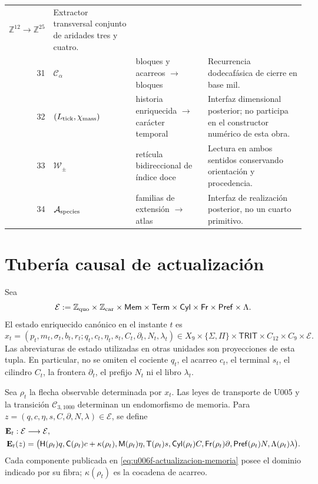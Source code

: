 \begin{longtable}{@{}r p{}p{}p{}@{}}
\(\mathbb Z^{12}\to\mathbb Z^{25}\)&
Extractor transversal conjunto de aridades tres y cuatro.\\
31&\(\mathcal C_\alpha\)&bloques y acarreos \(\to\) bloques&
Recurrencia dodecafásica de cierre en base mil.\\
32&\((L_{\rm tick},\chi_{\rm mass})\)&historia enriquecida \(\to\)
carácter temporal&
Interfaz dimensional posterior; no participa en el constructor numérico de
esta obra.\\
33&\(\mathcal W_\pm\)&retícula bidireccional de índice doce&
Lectura en ambos sentidos conservando orientación y procedencia.\\
34&\(\mathcal A_{\rm species}\)&familias de extensión \(\to\) atlas&
Interfaz de realización posterior, no un cuarto primitivo.\\
\bottomrule
\end{longtable}
\endgroup

\section{Tubería causal de actualización}

\begin{definition}
\label{def:u006f-esquema-estado}
Sea
\[
 \mathcal E:=
 \mathbb Z_{\rm quo}\times\mathbb Z_{\rm car}\times
 \mathsf{Mem}\times\mathsf{Term}\times\mathsf{Cyl}\times
 \mathsf{Fr}\times\mathsf{Pref}\times\Lambda .
\]
El estado enriquecido canónico en el instante \(t\) es
\begin{equation}
 x_t=(p_t,m_t,\sigma_t,b_t,r_t;
 q_t,c_t,\eta_t,s_t,C_t,\partial_t,N_t,\lambda_t)
 \in
 X_9\times\{\Sigma,\Pi\}\times\mathsf{TRIT}\times
 C_{12}\times C_9\times\mathcal E.
 \label{eq:u006f-esquema-estado}
\end{equation}
Las abreviaturas de estado utilizadas en otras unidades son proyecciones de
esta tupla. En particular, no se omiten el cociente \(q_t\), el acarreo
\(c_t\), el terminal \(s_t\), el cilindro \(C_t\), la frontera
\(\partial_t\), el prefijo \(N_t\) ni el libro \(\lambda_t\).
\end{definition}

Sea \(\rho_t\) la flecha observable determinada por \(x_t\). Las leyes de
transporte de U005 y la transición \(\mathcal C_{3,1000}\) determinan un
endomorfismo de memoria. Para
\(z=(q,c,\eta,s,C,\partial,N,\lambda)\in\mathcal E\), se define
\begin{align}
 \mathbf E_t:\mathcal E&\longrightarrow\mathcal E,\notag\\
 \mathbf E_t(z)&=\bigl(
 \mathsf H(\rho_t)q,
 \mathsf C(\rho_t)c+\kappa(\rho_t),
 \mathsf M(\rho_t)\eta,
 \mathsf T(\rho_t)s,
 \mathsf{Cyl}(\rho_t)C,
 \mathsf{Fr}(\rho_t)\partial,
 \mathsf{Pref}(\rho_t)N,
 \Lambda(\rho_t)\lambda
 \bigr).
 \label{eq:u006f-actualizacion-memoria}
\end{align}
Cada componente publicada en \eqref{eq:u006f-actualizacion-memoria} posee el
dominio indicado por su fibra; \(\kappa(\rho_t)\) es la cocadena de acarreo.

